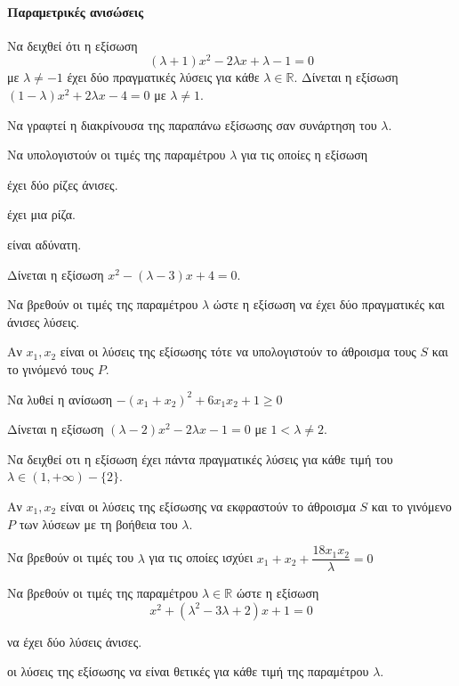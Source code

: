 \documentclass[11pt,a4paper,modern]{FFExercises}
\begin{document}
\paragraph{Παραμετρικές ανισώσεις}
\askhsh Να δειχθεί ότι η εξίσωση \[ (\lambda+1)x^2-2\lambda x+\lambda-1=0 \] με $ \lambda\neq-1 $ έχει δύο πραγματικές λύσεις για κάθε $ \lambda\in\mathbb{R} $.
\askhsh Δίνεται η εξίσωση $ (1-\lambda)x^2+2\lambda x-4=0 $ με $ \lambda\neq1 $.
\begin{alist}
\item Να γραφτεί η διακρίνουσα της παραπάνω εξίσωσης σαν συνάρτηση του $ \lambda $.
\item Να υπολογιστούν οι τιμές της παραμέτρου $ \lambda $ για τις οποίες η εξίσωση
\begin{rlist}
\item έχει δύο ρίζες άνισες.
\item έχει μια ρίζα.
\item είναι αδύνατη.
\end{rlist}
\end{alist}
\askhsh Δίνεται η εξίσωση $ x^2-(\lambda-3)x+4=0 $.
\begin{alist}
\item Να βρεθούν οι τιμές της παραμέτρου $ \lambda $ ώστε η εξίσωση να έχει δύο πραγματικές και άνισες λύσεις.
\item Αν $ x_1, x_2 $ είναι οι λύσεις της εξίσωσης τότε να υπολογιστούν το άθροισμα τους $ S $ και το γινόμενό τους $ P $.
\item Να λυθεί η ανίσωση $ -(x_1+x_2)^2+6x_1x_2+1\geq0 $
\end{alist}
\askhsh Δίνεται η εξίσωση $ (\lambda-2) x^2-2\lambda x-1=0 $ με $ 1<\lambda\neq2 $.
\begin{alist}
\item Να δειχθεί οτι η εξίσωση έχει πάντα πραγματικές λύσεις για κάθε τιμή του $ \lambda\in(1,+\infty)-\{2\} $.
\item Αν $ x_1, x_2 $ είναι οι λύσεις της εξίσωσης να εκφραστούν το άθροισμα $ S $ και το γινόμενο $ P $ των λύσεων με τη βοήθεια του $ \lambda $.
\item Να βρεθούν οι τιμές του $ \lambda $ για τις οποίες ισχύει $ x_1+x_2+\dfrac{18x_1x_2}{\lambda}=0 $
\end{alist}
\askhsh Να βρεθούν οι τιμές της παραμέτρου $ \lambda\in\mathbb{R} $ ώστε η εξίσωση 
\[ x^2+\left( \lambda^2-3\lambda+2\right) x+1=0 \]
\begin{alist}
\item να έχει δύο λύσεις άνισες.
\item οι λύσεις της εξίσωσης να είναι θετικές για κάθε τιμή της παραμέτρου $ \lambda $.
\end{alist}
\end{document}
